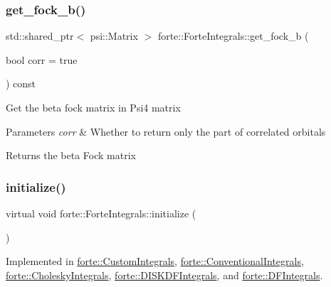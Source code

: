 \subsubsection{\texorpdfstring{get\+\_\+fock\+\_\+b()}{get\_fock\_b()}\hspace{0.1cm}{\footnotesize\ttfamily [2/2]}}
{\footnotesize\ttfamily std\+::shared\+\_\+ptr$<$ psi\+::\+Matrix $>$ forte\+::\+Forte\+Integrals\+::get\+\_\+fock\+\_\+b (\begin{DoxyParamCaption}\item[{bool}]{corr = {\ttfamily true} }\end{DoxyParamCaption}) const}

Get the beta fock matrix in Psi4 matrix 
\begin{DoxyParams}{Parameters}
{\em corr} & Whether to return only the part of correlated orbitals \\
\hline
\end{DoxyParams}
\begin{DoxyReturn}{Returns}
the beta Fock matrix 
\end{DoxyReturn}
\mbox{\label{classforte_1_1_forte_integrals_a7862835fa0f5f9abe13dfcd6730fa4be}} 
\subsubsection{\texorpdfstring{initialize()}{initialize()}}
{\footnotesize\ttfamily virtual void forte\+::\+Forte\+Integrals\+::initialize (\begin{DoxyParamCaption}{ }\end{DoxyParamCaption})\hspace{0.3cm}{\ttfamily [pure virtual]}}



Implemented in \mbox{\hyperlink{classforte_1_1_custom_integrals_a09375e296a39feb6a94c7cf4947d0206}{forte\+::\+Custom\+Integrals}}, \mbox{\hyperlink{classforte_1_1_conventional_integrals_a9d9d6528eb1241a9e03fcf82e4a88dbe}{forte\+::\+Conventional\+Integrals}}, \mbox{\hyperlink{classforte_1_1_cholesky_integrals_af303c4caae64a8a7231239a676cac65e}{forte\+::\+Cholesky\+Integrals}}, \mbox{\hyperlink{classforte_1_1_d_i_s_k_d_f_integrals_a3205b9dc431a7104969132b1f4bc206f}{forte\+::\+D\+I\+S\+K\+D\+F\+Integrals}}, and \mbox{\hyperlink{classforte_1_1_d_f_integrals_a8488339b2eff7dea6e98e29e9bf55a97}{forte\+::\+D\+F\+Integrals}}.

